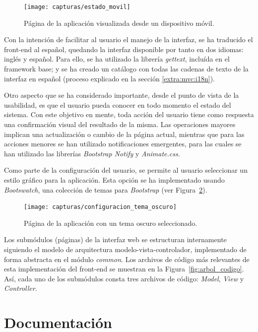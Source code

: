 \begin{figure}[!htp]
  \centering
  \texttt{[image: capturas/estado\_movil]}
  \caption{Página de la aplicación visualizada desde un dispositivo móvil.}
  \label{fig:captura:movil}
\end{figure}

Con la intención de facilitar al usuario el manejo de la interfaz, se ha traducido el \gls{front-end} al español, quedando la interfaz disponible por tanto en dos idiomas: inglés y español.
Para ello, se ha utilizado la librería \textit{gettext}, incluída en el \gls{framework} base; y se ha creado un catálogo con todas las cadenas de texto de la interfaz en español (proceso explicado en la sección \ref{extra:mvc:i18n}).

Otro aspecto que se ha considerado importante, desde el punto de vista de la usabilidad, es que el usuario pueda conocer en todo momento el estado del sistema.
Con este objetivo en mente, toda acción del usuario tiene como respuesta una confirmación visual del resultado de la misma.
Las operaciones mayores implican una actualización o cambio de la página actual, mientras que para las acciones menores se han utilizado notificaciones emergentes, para las cuales se han utilizado las librerías \textit{Bootstrap Notify} y \textit{Animate.css}.

Como parte de la configuración del usuario, se permite al usuario seleccionar un estilo gráfico para la aplicación.
Esta opción se ha implementado usando \textit{Bootswatch}, una colección de temas para \textit{Bootstrap} (ver Figura~\ref{fig:captura:oscuro}).

\begin{figure}[!htp]
  \centering
  \texttt{[image: capturas/configuracion\_tema\_oscuro]}
  \caption{Página de la aplicación con un tema oscuro seleccionado.}
  \label{fig:captura:oscuro}
\end{figure}

Los submódulos (páginas) de la interfaz web se estructuran internamente siguiendo el modelo de arquitectura modelo-vista-controlador, implementado de forma abstracta en el módulo \textit{common}.
Los archivos de código más relevantes de esta implementación del \gls{front-end} se muestran en la Figura~\ref{fig:arbol_codigo}.
Así, cada uno de los submódulos consta tres archivos de código: \textit{Model}, \textit{View} y \textit{Controller}.

\section{Documentación \label{sec:imp:docs}}

